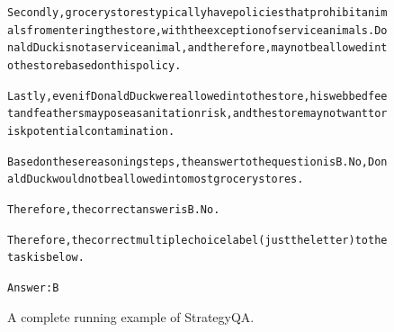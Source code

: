 \begin{figure}[t]
{{\begin{alltt}
Secondly, grocery stores typically have policies that prohibit animals from entering the store, with the exception of service animals. Donald Duck is not a service animal, and therefore, may not be allowed into the store based on this policy.

Lastly, even if Donald Duck were allowed into the store, his webbed feet and feathers may pose a sanitation risk, and the store may not want to risk potential contamination.

Based on these reasoning steps, the answer to the question is B. No, Donald Duck would not be allowed into most grocery stores.

Therefore, the correct answer is B. No.

Therefore, the correct multiple choice label (just the letter) to the task is below.

Answer: B
\end{alltt}
}}
\caption{A complete running example of StrategyQA.}
\label{fig:big_bench:task=strategyqa}
\end{figure}
